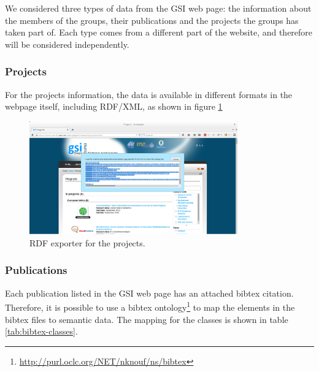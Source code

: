 We considered three types of data from the GSI web page: the information about the members of the groups, their publications and the projects the groups has taken part of. Each type comes from a different part of the website, and therefore will be considered independently. 

\subsubsection{Projects}

For the projects information, the data is available in different formats in the webpage itself, including RDF/XML, as shown in figure \ref{fig:gsiprojects}

\begin{figure}[!htbp]
    \centering
    \includegraphics[width=0.8\textwidth]{img/screens/gsi-projects.png}
    \caption{RDF exporter for the projects.}
    \label{fig:gsiprojects}
\end{figure}


\subsubsection{Publications}
\label{subsec:bibtexrdf}

Each publication listed in the GSI web page has an attached bibtex citation. Therefore, it is possible to use a bibtex ontology\footnote{\url{http://purl.oclc.org/NET/nknouf/ns/bibtex}} to map the elements in the bibtex files to semantic data. The mapping for the classes is shown in table \ref{tab:bibtex-classes}.

